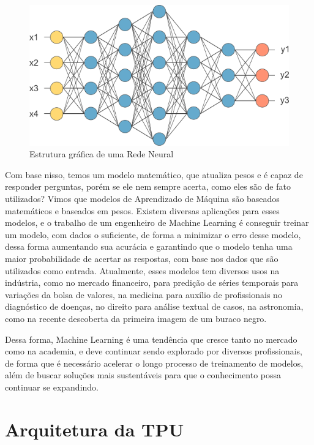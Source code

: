 \documentclass{report}
\begin{document}
\begin{figure}[h]
	\includegraphics[scale=0.5]{neuralNetwork}
	\centering
	\caption{Estrutura gráfica de uma Rede Neural}
\end{figure}

Com base nisso, temos um modelo matemático, que atualiza pesos e é capaz de responder perguntas, porém se ele nem sempre acerta, como eles são de fato utilizados? Vimos que modelos de Aprendizado de Máquina são baseados matemáticos e baseados em pesos. Existem diversas aplicações para esses modelos, e o trabalho de um engenheiro de Machine Learning é conseguir treinar um modelo, com dados o suficiente, de forma a minimizar o erro desse modelo, dessa forma aumentando sua acurácia e garantindo que o modelo tenha uma maior probabilidade de acertar as respostas, com base nos dados que são utilizados como entrada. Atualmente, esses modelos tem diversos usos na indústria, como no mercado financeiro, para predição de séries temporais para variações da bolsa de valores, na medicina para auxílio de profissionais no diagnóstico de doenças, no direito para análise textual de casos, na astronomia, como na recente descoberta da primeira imagem de um buraco negro. 

Dessa forma, Machine Learning é uma tendência que cresce tanto no mercado como na academia, e deve continuar sendo explorado por diversos profissionais, de forma que é necessário acelerar o longo processo de treinamento de modelos, além de buscar soluções mais sustentáveis para que o conhecimento possa continuar se expandindo.


\chapter{Arquitetura da TPU}

\end{document}

